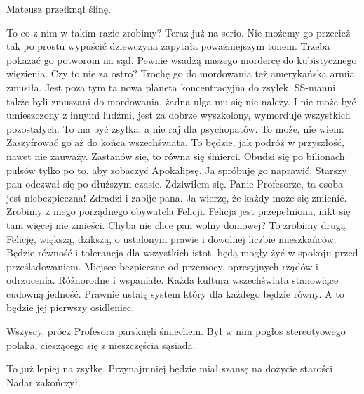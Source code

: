 Mateusz przełknął ślinę.

\begin{dialogue}
\ds{} To co z nim w takim razie zrobimy? Teraz już na serio. Nie możemy go przecież tak po prostu wypuścić \dm{} dziewczyna zapytała poważniejszym tonem.
\ds{} Trzeba pokazać go potworom na sąd. Pewnie wsadzą naszego mordercę do kubistycznego więzienia.
\ds{} Czy to nie za ostro? Trochę go do mordowania też amerykańska armia zmusiła. Jest poza tym ta nowa planeta koncentracyjna do zsyłek.
\ds{} SS-manni także byli zmuszani do mordowania, żadna ulga mu się nie należy. 
I nie może być umieszczony z innymi ludźmi, jest za dobrze wyszkolony, wymorduje wszystkich pozostałych. To ma być zsyłka, a nie raj dla psychopatów.
\ds{} To może, nie wiem. Zaszyfrować go aż do końca wszechświata. To będzie, jak podróż w przyszłość, nawet nie zauważy.
\ds{} Zastanów się, to równa się śmierci. Obudzi się po bilionach pulsów tylko po to, aby zobaczyć Apokalipsę.
\ds{} Ja spróbuję go naprawić. \dm{} Starszy pan odezwał się po dłuższym czasie. Zdziwiłem się.
\ds{} Panie Profesorze, ta osoba jest niebezpieczna! Zdradzi i zabije pana.
\ds{} Ja wierzę, że każdy może się zmienić. Zrobimy z niego porządnego obywatela Felicji.
\ds{} Felicja jest przepełniona, nikt się tam więcej nie zmieści. Chyba nie chce pan wolny domowej?
\ds{} To zrobimy drugą Felicję, większą, dzikszą, o ustalonym prawie i dowolnej liczbie mieszkańców. Będzie równość i tolerancja dla wszystkich istot, będą mogły żyć w spokoju przed prześladowaniem.
Miejsce bezpieczne od przemocy, opresyjnych rządów i odrzucenia. Różnorodne i wspaniałe. Każda kultura wszechświata stanowiące cudowną jedność.
Prawnie ustalę system który dla każdego będzie równy.
A to będzie jej pierwszy osidleniec.
\end{dialogue}

Wszyscy, prócz Profesora parsknęli śmiechem.
Był w nim pogłos stereotyowego polaka, cieszącego się z nieszczęścia sąsiada.

\begin{dialogue}
\ds{} To już lepiej na zsyłkę. Przynajmniej będzie miał szansę na dożycie starości \dm{} Nadar zakończył.
\end{dialogue}

